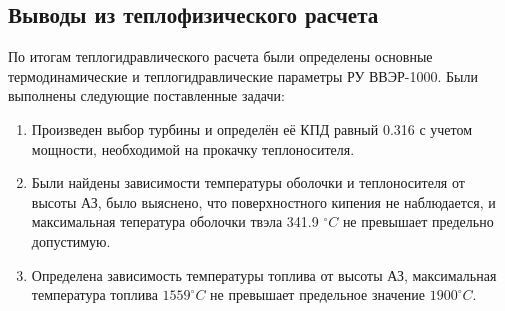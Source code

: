 \subsection{Выводы из теплофизического расчета}
По итогам теплогидравлического расчета были определены основные термодинамические и теплогидравлические параметры РУ ВВЭР-1000. Были выполнены следующие поставленные задачи:
\begin{enumerate}
   \item Произведен выбор турбины и определён её КПД равный 0.316 с учетом мощности, необходимой на прокачку теплоносителя.
   \item Были найдены зависимости температуры оболочки и теплоносителя от высоты АЗ, было выяснено, что поверхностного кипения не наблюдается, и максимальная тепература оболочки твэла 341.9 $^\circ C$ не превышает предельно допустимую.
   \item Определена зависимость температуры топлива от высоты АЗ, максимальная температура топлива $1559 ^\circ C$ не превышает предельное значение $1900 ^\circ C$.
\end{enumerate}

